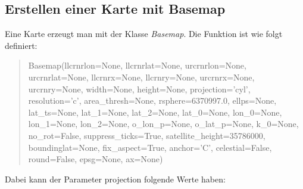 \subsection{Erstellen einer Karte mit Basemap}
\label{sec:erstellen}
Eine Karte erzeugt man mit der Klasse \emph{Basemap}. Die Funktion ist wie folgt definiert:
\begin{verse}
\textsf{ Basemap(llcrnrlon=None, llcrnrlat=None, urcrnrlon=None, urcrnrlat=None, llcrnrx=None, llcrnry=None, urcrnrx=None, urcrnry=None, width=None, height=None, projection='cyl', resolution='c', area\_thresh=None, rsphere=6370997.0, ellps=None, lat\_ts=None, lat\_1=None, lat\_2=None, lat\_0=None, lon\_0=None, lon\_1=None, lon\_2=None, o\_lon\_p=None, o\_lat\_p=None, k\_0=None, no\_rot=False, suppress\_ticks=True, satellite\_height=35786000, boundinglat=None, fix\_aspect=True, anchor='C', celestial=False, round=False, epsg=None, ax=None)
}\end{verse}
Dabei kann der Parameter \textsf{projection} folgende Werte haben:\\
\newline
